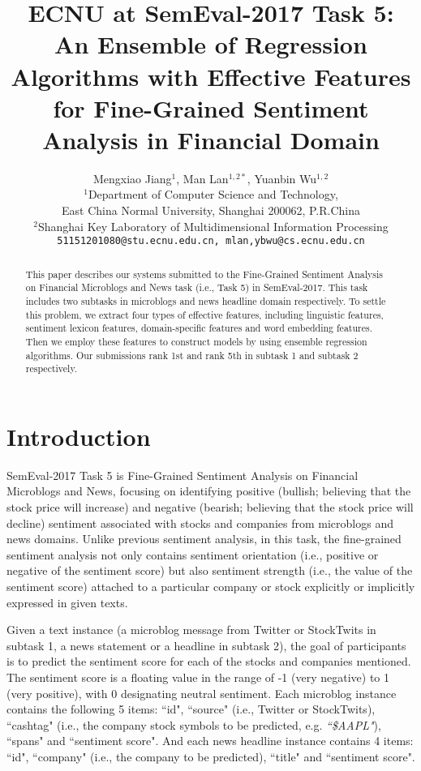 \documentclass[11pt,a4paper]{article}
\title{ECNU at SemEval-2017 Task 5: An Ensemble of Regression Algorithms with Effective Features for Fine-Grained Sentiment Analysis in Financial Domain}
\author{Mengxiao Jiang$^{1}$, Man Lan$^{1,2\ast}$, Yuanbin Wu$^{1,2}$\\
        $^1$Department of Computer Science and Technology, \\
        East China Normal University, Shanghai 200062, P.R.China \\
        $^2$Shanghai Key Laboratory of Multidimensional Information Processing \\
        {\tt 51151201080@stu.ecnu.edu.cn, mlan,ybwu@cs.ecnu.edu.cn} \\
}
\date{}
\begin{document}
\maketitle
\begin{abstract}
This paper describes our systems submitted to the Fine-Grained Sentiment Analysis on Financial Microblogs and News task (i.e., Task 5) in SemEval-2017. This task includes two subtasks in microblogs and news headline domain respectively. To settle this problem, we extract four types of effective features, including linguistic features, sentiment lexicon features, domain-specific features and word embedding features. Then we employ these features to construct models by using ensemble regression algorithms. Our submissions rank 1st and rank 5th in subtask 1 and subtask 2 respectively.
\end{abstract}



\section{Introduction}
\label{sect:intro}


SemEval-2017 Task 5 is Fine-Grained Sentiment Analysis on Financial Microblogs and News\cite{SemEval-2017:task5}, focusing on identifying positive (bullish; believing that the stock price will increase) and negative (bearish; believing that the stock price will decline) sentiment associated with stocks and companies from microblogs and news domains. Unlike previous sentiment analysis, in this task, the fine-grained sentiment analysis not only contains sentiment orientation (i.e., positive or negative of the sentiment score) but also sentiment strength (i.e., the value of the sentiment score) attached to a particular company or stock explicitly or implicitly expressed in given texts.



Given a text instance (a microblog message from Twitter or StockTwits in subtask 1, a news statement or a headline in subtask 2), the goal of participants is to predict the sentiment score for each of the stocks and companies mentioned. The sentiment score is a floating value in the range of -1 (very negative) to 1 (very positive), with 0 designating neutral sentiment. Each microblog instance contains the following 5 items: ``id", ``source" (i.e., Twitter or StockTwits), ``cashtag" (i.e., the company stock symbols to be predicted, e.g. \emph{``\$AAPL"}), ``spans" and ``sentiment score". And each news headline instance contains 4 items: ``id", ``company" (i.e., the company to be predicted), ``title" and ``sentiment score".
\end{document}
